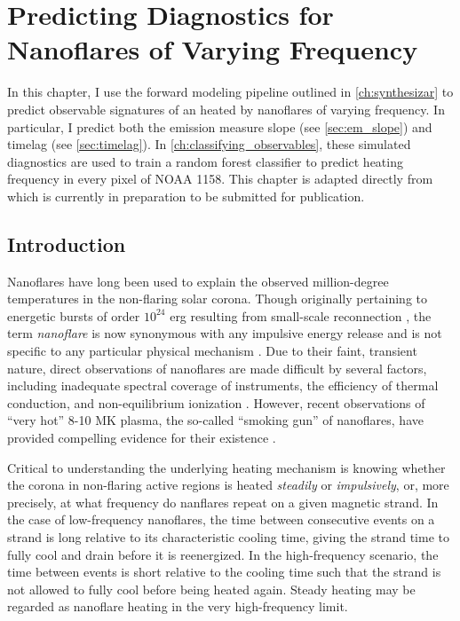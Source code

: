 \chapter{Predicting Diagnostics for Nanoflares of Varying Frequency}\label{ch:modeling-observables}

In this chapter, I use the forward modeling pipeline outlined in \autoref{ch:synthesizar} to predict observable signatures of an \AR{} heated by nanoflares of varying frequency. In particular, I predict both the emission measure slope (see \autoref{sec:em_slope}) and timelag (see \autoref{sec:timelag}). In \autoref{ch:classifying_observables}, these simulated diagnostics are used to train a random forest classifier to predict heating frequency in every pixel of \AR{} NOAA 1158. This chapter is adapted directly from \citet{barnes_understanding_2019} which is currently in preparation to be submitted for publication. 

\section{Introduction}\label{sec:modeling-observables:introduction}

Nanoflares have long been used to explain the observed million-degree temperatures in the non-flaring solar corona. Though originally pertaining to energetic bursts of order $10^{24}$ erg resulting from small-scale reconnection \citep{parker_nanoflares_1988}, the term \textit{nanoflare} is now synonymous with any impulsive energy release and is not specific to any particular physical mechanism \citep{klimchuk_key_2015}. Due to their faint, transient nature, direct observations of nanoflares are made difficult by several factors, including inadequate spectral coverage of instruments, the efficiency of thermal conduction, and non-equilibrium ionization \citep{cargill_implications_1994,winebarger_defining_2012,barnes_inference_2016}. However, recent observations of ``very hot'' 8-10 MK plasma, the so-called ``smoking gun'' of nanoflares, have provided compelling evidence for their existence \citep[e.g.][]{brosius_pervasive_2014,caspi_new_2015,parenti_spectroscopy_2017,ishikawa_detection_2017}.

Critical to understanding the underlying heating mechanism is knowing whether the corona in non-flaring active regions is heated \textit{steadily} or \textit{impulsively}, or, more precisely, at what frequency do nanflares repeat on a given magnetic strand. In the case of low-frequency nanoflares, the time between consecutive events on a strand is long relative to its characteristic cooling time, giving the strand time to fully cool and drain before it is reenergized. In the high-frequency scenario, the time between events is short relative to the cooling time such that the strand is not allowed to fully cool before being heated again. Steady heating may be regarded as nanoflare heating in the very high-frequency limit.


